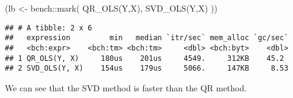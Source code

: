 \documentclass[
]{article}
\newenvironment{Shaded}{\begin{snugshade}}{\end{snugshade}}
\newcommand{\FunctionTok}[1]{\textcolor[rgb]{0.00,0.00,0.00}{#1}}
\newcommand{\NormalTok}[1]{#1}
\newcommand{\OtherTok}[1]{\textcolor[rgb]{0.56,0.35,0.01}{#1}}
\newcommand{\SpecialCharTok}[1]{\textcolor[rgb]{0.00,0.00,0.00}{#1}}
\begin{document}
\begin{Shaded}
\end{Shaded}

\begin{Shaded}
\begin{Highlighting}[]
\NormalTok{(lb }\OtherTok{\textless{}{-}}\NormalTok{ bench}\SpecialCharTok{::}\FunctionTok{mark}\NormalTok{(}
  \FunctionTok{QR\_OLS}\NormalTok{(Y,X),}
  \FunctionTok{SVD\_OLS}\NormalTok{(Y,X)}
\NormalTok{))}
\end{Highlighting}
\end{Shaded}

\begin{verbatim}
## # A tibble: 2 x 6
##   expression         min   median `itr/sec` mem_alloc `gc/sec`
##   <bch:expr>    <bch:tm> <bch:tm>     <dbl> <bch:byt>    <dbl>
## 1 QR_OLS(Y, X)     180us    201us     4549.     312KB    45.2 
## 2 SVD_OLS(Y, X)    154us    179us     5066.     147KB     8.53
\end{verbatim}

We can see that the SVD method is faster than the QR method.
\end{document}
